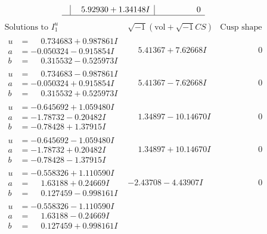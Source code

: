 \documentclass[1p]{elsarticle_modified}
\theoremstyle{definition}
\newcommand{\I}{\sqrt{-1}}
\begin{document}
$$\begin{array}{c|c|c}
 & \phantom{-}5.92930 + 1.34148 I & \phantom{-0.000000 } 0\\
 \hline 
 \end{array}$$\newpage$$\begin{array}{c|c|c}  
\text{Solutions to }I^u_{1}& \I (\text{vol} + \sqrt{-1}CS) & \text{Cusp shape}\\
 \hline 
\begin{aligned}
u &= \phantom{-}0.734683 + 0.987861 I \\
a &= -0.050324 - 0.915854 I \\
b &= \phantom{-}0.315532 - 0.525973 I\end{aligned}
 & \phantom{-}5.41367 + 7.62668 I & \phantom{-0.000000 } 0 \\ \hline\begin{aligned}
u &= \phantom{-}0.734683 - 0.987861 I \\
a &= -0.050324 + 0.915854 I \\
b &= \phantom{-}0.315532 + 0.525973 I\end{aligned}
 & \phantom{-}5.41367 - 7.62668 I & \phantom{-0.000000 } 0 \\ \hline\begin{aligned}
u &= -0.645692 + 1.059480 I \\
a &= -1.78732 - 0.20482 I \\
b &= -0.78428 + 1.37915 I\end{aligned}
 & \phantom{-}1.34897 - 10.14670 I & \phantom{-0.000000 } 0 \\ \hline\begin{aligned}
u &= -0.645692 - 1.059480 I \\
a &= -1.78732 + 0.20482 I \\
b &= -0.78428 - 1.37915 I\end{aligned}
 & \phantom{-}1.34897 + 10.14670 I & \phantom{-0.000000 } 0 \\ \hline\begin{aligned}
u &= -0.558326 + 1.110590 I \\
a &= \phantom{-}1.63188 + 0.24669 I \\
b &= \phantom{-}0.127459 - 0.998161 I\end{aligned}
 & -2.43708 - 4.43907 I & \phantom{-0.000000 } 0 \\ \hline\begin{aligned}
u &= -0.558326 - 1.110590 I \\
a &= \phantom{-}1.63188 - 0.24669 I \\
b &= \phantom{-}0.127459 + 0.998161 I\end{aligned}

\end{array}$$
\end{document}
